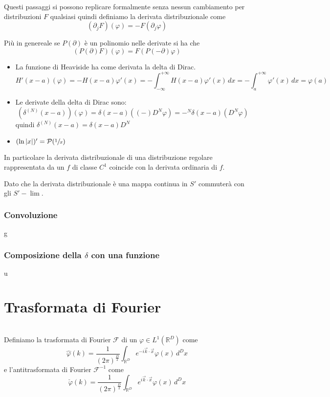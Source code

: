 \documentclass[11pt,a4paper,twoside]{book}
\newenvironment{definizione}[1][\empty]{\begin{Definizione}{
\ifx\empty#1\relax\else\mdseries\itshape#1\\\fi
}{}}{\end{Definizione}}
\newenvironment{esempio}[1][Esempio]{ 
  \begin{center}\begin{tcolorbox}[
  title={#1:~},
  width=0.9\linewidth,
  flush right,
  enhanced jigsaw, 
  colback=white, 
  frame hidden, 
  sharpish corners, arc=3mm,
  borderline west = {1pt}{0pt}{gray},
  borderline south = {1pt}{0pt}{gray},
  coltitle=black, 
  fonttitle=\small\bfseries, 
  attach title to upper, 
  breakable,
  top=2.5pt, bottom=0.3pt]\small
  }{
 \normalsize \end{tcolorbox}\end{center}
}
\theoremstyle{esss}
\theoremstyle{dotless}
\numberwithin{equation}{section} %
\begin{document}
Questi passaggi si possono replicare formalmente senza nessun cambiamento per distribuzioni $F$ qualsiasi quindi definiamo la derivata distribuzionale come
\begin{equation}
(\partial_j F)(\varphi)=-F(\partial_j\varphi)
\end{equation}

Più in genereale se $P(\partial)$ è un polinomio nelle derivate si ha che
\[
\left(P(\partial)F\right)(\varphi)=F\left(P(-\partial)\varphi\right)
\]

\begin{esempio}[Esempi di derivate distribuzionali]
\begin{itemize}[label=$\cdot$]
\item La funzione di Heaviside ha come derivata la delta di Dirac.
\[
H'(x-a)(\varphi)=-H(x-a)\varphi'(x)=-\int_{-\infty}^{+\infty} H(x-a)\varphi'(x)\,dx=-\int_{a}^{+\infty} \varphi'(x)\,dx=\varphi(a)
\]
\item Le derivate della delta di Dirac sono:
\[
\left(\delta^{(N)}(x-a)\right)(\varphi)=\delta(x-a)\left((-)D^N \varphi\right)=-^N\delta(x-a)(D^N \varphi)
\]
quindi $\delta^{(N)}(x-a)=\delta(x-a)D^N$
\item $(\ln{|x|})'=\mathcal{P}(\sfrac{1}{x})$
\end{itemize}
\end{esempio}

In particolare la derivata distribuzionale di una distribuzione regolare rappresentata da un $f$ di classe $C^1$ coincide con la derivata ordinaria di $f$.

Dato che la derivata distribuzionale è una mappa continua in $S'$ commuterà con gli $S'-\lim$.

\subsubsection{Convoluzione}
g

\subsubsection{Composizione della $\delta$ con una funzione}
u

\section{Trasformata di Fourier}
\begin{definizione}
Definiamo la trasformata di Fourier $\mathcal{F}$ di un $\varphi\in L^1(\mathbb{R}^D)$ come
\begin{equation}
\hat{\varphi}(k)=
\dfrac{1}{(2\pi)^{\frac{D}{2}}}
\int_{\mathbb{R}^D}e^{-i\vec{k}\cdot\vec{x}}\varphi(x)\,d^Dx
\end{equation}
e l'antitrasformata di Fourier $\mathcal{F}^{-1}$ come
\begin{equation}
\check{\varphi}(k)=
\dfrac{1}{(2\pi)^{\frac{D}{2}}}
\int_{\mathbb{R}^D}e^{i\vec{k}\cdot\vec{x}}\varphi(x)\,d^Dx
\end{equation}
\end{definizione}
\end{document}
